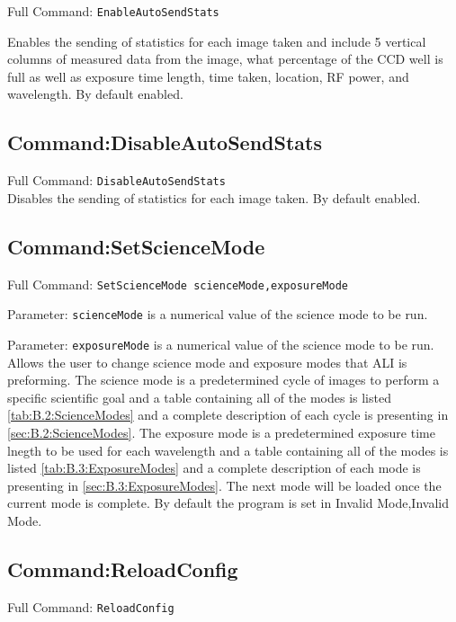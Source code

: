 Full Command: \texttt{EnableAutoSendStats}

Enables the sending of statistics for each image taken and include 5 vertical columns of measured data from the image, what percentage of the CCD well is full as well as exposure time length, time taken, location, RF power, and wavelength. By default enabled.

\subsection{Command:DisableAutoSendStats}

Full Command: \texttt{DisableAutoSendStats}\\

Disables the sending of statistics for each image taken. By default enabled.

\subsection{Command:SetScienceMode}

Full Command: \texttt{SetScienceMode scienceMode,exposureMode}

Parameter: \texttt{scienceMode} is a numerical value of the science mode to be run.

Parameter: \texttt{exposureMode} is a numerical value of the science mode to be run.\\

Allows the user to change science mode and exposure modes that ALI is preforming. The science mode is a predetermined cycle of images to perform a specific scientific goal and a table containing all of the modes is listed \autoref{tab:B.2:ScienceModes} and a complete description of each cycle is presenting in \autoref{sec:B.2:ScienceModes}. The exposure mode is a predetermined exposure time lnegth to be used for each wavelength and a table containing all of the modes is listed \autoref{tab:B.3:ExposureModes} and a complete description of each mode is presenting in \autoref{sec:B.3:ExposureModes}. The next mode will be loaded once the current mode is complete. By default the program is set in Invalid Mode,Invalid Mode.

\subsection{Command:ReloadConfig}

Full Command: \texttt{ReloadConfig}\\

